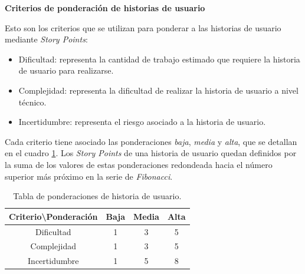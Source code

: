 \documentclass[
11pt, %
]{charter}
\begin{document}
\textbf{Criterios de ponderación de historias de usuario}

Esto son los criterios que se utilizan para ponderar a las historias de usuario mediante \textit{Story Points}:
\begin{itemize}
    \item Dificultad: representa la cantidad de trabajo estimado que requiere la historia de usuario para realizarse.
    \item Complejidad: representa la dificultad de realizar la historia de usuario a nivel técnico.
    \item Incertidumbre: representa el riesgo asociado a la historia de usuario.
\end{itemize}

Cada criterio tiene asociado las ponderaciones \textit{baja}, \textit{media} y \textit{alta}, que se detallan en el cuadro \ref{table:ponderaciones}. Los \textit{Story Points} de una historia de usuario quedan definidos por la suma de los valores de estas ponderaciones redondeada hacia el número superior más próximo en la serie de \textit{Fibonacci}.

\begin{table}[htpb]
\centering
\begin{tabular}{|c|c|c|c|}
\hline
\rowcolor[HTML]{C0C0C0}
Criterio\textbackslash Ponderación & Baja & Media & Alta \\ \hline
Dificultad & 1 & 3 & 5 \\ \hline
Complejidad & 1 & 3 & 5 \\ \hline
Incertidumbre & 1 & 5 & 8 \\ \hline
\end{tabular}
\caption{Tabla de ponderaciones de historia de usuario.}
\label{table:ponderaciones}
\end{table}
\end{document}
